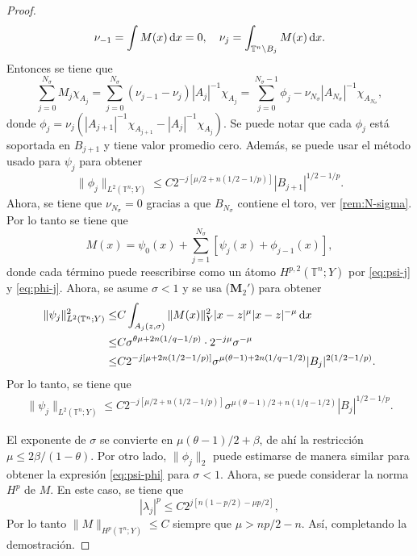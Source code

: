 \begin{proof}
\begin{equation*}
		\nu_{-1} = \int M(x)\mathop{}\!\mathrm{d} x = 0, \quad \nu_j = \int_{\mathbb{T}^n\setminus B_j} M(x)\mathop{}\!\mathrm{d} x.
	\end{equation*}
	Entonces se tiene que
	\begin{equation*}
		\sum_{j=0}^{N_\sigma}M_j \chi_{A_j} =\sum_{j=0}^{N_\sigma}(\nu_{j-1}-\nu_j)|A_j|^{-1}\chi_{A_j} = \sum_{j=0}^{N_\sigma-1}\phi_j - \nu_{N_\sigma}|A_{N_\sigma}|^{-1}\chi_{A_{N_\sigma}},
	\end{equation*}
	donde $\phi_j=\nu_j\left( |A_{j+1}|^{-1}\chi_{A_{j+1}} - |A_{j}|^{-1}\chi_{A_{j}}  \right)$. Se puede notar que cada $\phi_j$ está soportada en $B_{j+1}$ y tiene valor promedio cero. Además, se puede usar el método usado para $\psi_j$ para obtener
	\begin{equation}
		\|\phi_j\|_{L^2(\mathbb{T}^n;Y)} \leq C 2^{-j[\mu/2 + n(1/2-1/p)]} |B_{j+1}|^{1/2-1/p}.
		\label{eq:phi-j}
	\end{equation}
	Ahora, se tiene que $\nu_{N_\sigma}=0$ gracias a que $B_{N_\sigma}$ contiene el toro, ver \cref{rem:N-sigma}. Por lo tanto se tiene que 
	\begin{equation}
		M(x)= \psi_0(x)+ \sum_{j=1}^{N_\sigma} \left[\psi_j(x) + \phi_{j-1}(x) \right],
		\label{eq:psi-phi}
	\end{equation}
	donde cada término puede reescribirse como un átomo $H^{p,2}(\mathbb{T}^n; Y) $ por \cref{eq:psi-j} y \cref{eq:phi-j}. Ahora, se asume $\sigma<1$ y se usa ($\mathbf{M}_2'$) para obtener
	\begin{align*}
		\|\psi_j\|_{L^2(\mathbb{T}^n;Y)}^2 \leq & C \int_{A_j(z,\sigma)}\|M(x)\|_Y^2|x-z|^{\mu} |x-z|^{-\mu} \mathop{}\!\mathrm{d} x
		\\
		\leq & C\sigma^{\theta\mu+2n(1/q-1/p)}\cdot2^{-j\mu} \sigma^{-\mu}
		\\
		\leq & C 2^{-j[\mu + 2n(1/2-1/p)]} \sigma^{\mu(\theta-1) + 2n(1/q-1/2)} |B_j|^{2(1/2-1/p)}.
	\end{align*}
	Por lo tanto, se tiene que 
	\begin{align*}
		\|\psi_j\|_{L^2(\mathbb{T}^n;Y)} \leq C 2^{-j[\mu/2 + n(1/2-1/p)]} \sigma^{\mu(\theta-1)/2+n(1/q-1/2)} |B_j|^{1/2-1/p}.
	\end{align*}
	
	El exponente de $\sigma$ se convierte en $\mu(\theta-1)/2 + \beta$, de ahí la restricción $\mu \leq 2\beta/(1-\theta)$. Por otro lado, $\|\phi_j\|_2$ puede estimarse de manera similar para obtener la expresión \cref{eq:psi-phi} para $\sigma<1$. Ahora, se puede considerar la norma $H^p$ de $M$. En este caso, se tiene que
	\begin{equation*}
		|\lambda_j|^p \leq C 2^{j[ n(1-p/2) -\mu p/2 ]},
	\end{equation*}
	Por lo tanto $\|M\|_{H^p(\mathbb{T}^n;Y)} \leq C$ siempre que $\mu > np/2 -n$. Así, completando la demostración.
\end{proof}
